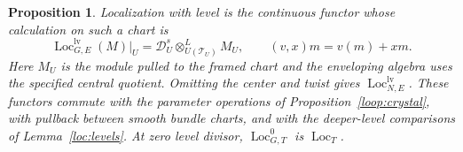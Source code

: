 \documentclass[11pt]{article}
\numberwithin{equation}{section}
\newtheorem{proposition}[theorem]{Proposition}
\theoremstyle{definition}
\theoremstyle{remark}
\begin{document}
\begin{proposition}\label{loc:construction}
Localization with level is the continuous functor whose calculation
on such a chart is
\begin{equation}\label{eq:T2}
 \operatorname{Loc}_{G,E}^{\mathrm{lv}}(M)|_U
   =\mathscr D_U^s\otimes^L_{U(\mathcal T_U)}M_U,
 \qquad (v,x)m=v(m)+xm.
\end{equation}
Here $M_U$ is the module pulled to the framed chart and the enveloping
algebra uses the specified central quotient.  Omitting the center and
twist gives $\operatorname{Loc}_{N,E}^{\mathrm{lv}}$.
These functors commute with the parameter operations of
Proposition~\ref{loop:crystal}, with pullback between smooth bundle charts, and with
the deeper-level comparisons of Lemma~\ref{loc:levels}.
At zero level divisor, $\operatorname{Loc}_{G,T}^0$ is
$\operatorname{Loc}_T$.
\end{proposition}
\end{document}
